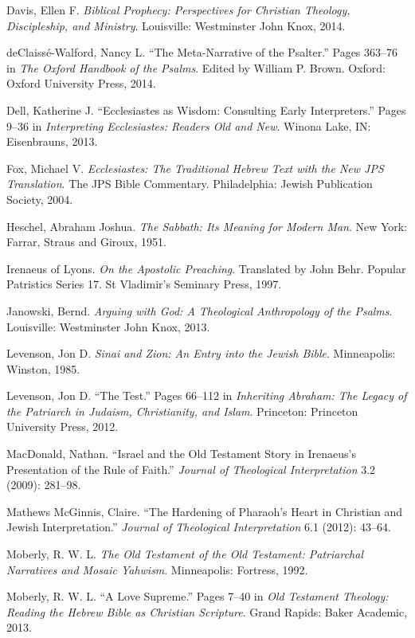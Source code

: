 \documentclass[titlepage]{article}
\begin{document}
\begin{thebibliography}{99}
 Davis, Ellen F. \emph{Biblical Prophecy: Perspectives for Christian Theology, Discipleship, and Ministry}. Louisville: Westminster John Knox, 2014.

 deClaissé-Walford, Nancy L. “The Meta-Narrative of the Psalter.” Pages 363–76 in \emph{The Oxford Handbook of the Psalms}. Edited by William P. Brown. Oxford: Oxford University Press, 2014.

 Dell, Katherine J. “Ecclesiastes as Wisdom: Consulting Early Interpreters.” Pages 9–36 in \emph{Interpreting Ecclesiastes: Readers Old and New}. Winona Lake, IN: Eisenbrauns, 2013.

 Fox, Michael V. \emph{Ecclesiastes: The Traditional Hebrew Text with the New JPS Translation}. The JPS Bible Commentary. Philadelphia: Jewish Publication Society, 2004.

 Heschel, Abraham Joshua. \emph{The Sabbath: Its Meaning for Modern Man}. New York: Farrar, Straus and Giroux, 1951.

 Irenaeus of Lyons. \emph{On the Apostolic Preaching}. Translated by John Behr. Popular Patristics Series 17. St Vladimir’s Seminary Press, 1997.

 Janowski, Bernd. \emph{Arguing with God: A Theological Anthropology of the Psalms}. Louisville: Westminster John Knox, 2013.

 Levenson, Jon D. \emph{Sinai and Zion: An Entry into the Jewish Bible}. Minneapolis: Winston, 1985.

 Levenson, Jon D. “The Test.” Pages 66–112 in \emph{Inheriting Abraham: The Legacy of the Patriarch in Judaism, Christianity, and Islam}. Princeton: Princeton University Press, 2012.

 MacDonald, Nathan. “Israel and the Old Testament Story in Irenaeus’s Presentation of the Rule of Faith.” \emph{Journal of Theological Interpretation} 3.2 (2009): 281–98.

 Mathews McGinnis, Claire. “The Hardening of Pharaoh’s Heart in Christian and Jewish Interpretation.” \emph{Journal of Theological Interpretation} 6.1 (2012): 43–64.

 Moberly, R. W. L. \emph{The Old Testament of the Old Testament: Patriarchal Narratives and Mosaic Yahwism}. Minneapolis: Fortress, 1992.

 Moberly, R. W. L. “A Love Supreme.” Pages 7–40 in \emph{Old Testament Theology: Reading the Hebrew Bible as Christian Scripture}. Grand Rapids: Baker Academic, 2013.


\end{thebibliography}
\end{document}
